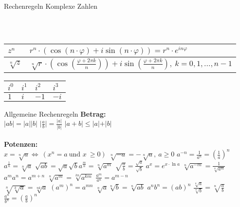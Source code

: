 \begin{Rechenregeln}{Rechenregeln Komplexe Zahlen}{}
\begin{tabular}{|l|l|l|}
        \hline
    \end{tabular}\\
    \begin{tabular}{|l|l|}
        \hline
        \(z^{n}\) & \(r^{n} \cdot (\cos(n\cdot \varphi)+ i \sin(n \cdot \varphi)) = r^{n} \cdot e^{in\varphi}\)\rule{0pt}{2.6ex}\\
        \hline
        \(\sqrt[n]{z}\) & \(\sqrt[n]{r}\cdot(\cos(\frac{\varphi + 2\pi k}{n})) + i\sin(\frac{\varphi + 2 \pi k }{n}), \ k = 0, 1, ..., n-1 \) \rule{0pt}{2.6ex}\\
        \hline
    \end{tabular}
    \begin{tabular}{|l|l|l|l|}
        \hline \(i^{0}\) & \(i^{1}\) & \(i^{2}\) & \(i^{3}\)\\
        \hline \(1\) & \(i\) & \(-1\) & \(-i\)\\
        \hline
    \end{tabular}
\end{Rechenregeln}

\begin{Rechenregeln}{Allgemeine Rechenregeln}{}
    \textbf{Betrag:} \\
    \(\vert ab \vert = \vert a \vert \vert b\vert \) \abstand 
    \(\vert \frac{a}{b} \vert = \frac{\vert a \vert}{ \vert b\vert} \) \abstand
    \(\vert a + b \vert \le \vert a \vert + \vert b \vert\) \\
    \\
    \textbf{Potenzen:} \\
    \(x = \sqrt[n]{a} 	\Leftrightarrow\ (x^{n}  = a \ \text{und } x \ \ge 0)\) \abstand
    \(\sqrt[n]{-a} = - \sqrt[n]{a}, \ a \ge 0\) \abstand
    \(a^{-n} = \frac{1}{a^{n}} = (\frac{1}{a})^{n}\) \abstand \(a^{\frac{1}{n}} = \sqrt[n]{a}\) \abstand \(\sqrt{ab} = \sqrt{a}\sqrt{b}\)\abstand \(a^{\frac{m}{n}} = \sqrt[n]{a^{m}}\) \abstand
    \( \sqrt{\frac{a}{b}} = \frac{\sqrt{a}}{\sqrt{b}} \) \abstand \( a^{x} = e^{x \cdot \ln a}\) \abstand 
    \(\sqrt[n]{a^{-m}} = \frac{1}{\sqrt[n]{a^{m}}}\)
    \(a^{m}a^{n} = a^{m+n} \) \abstand \(\sqrt[n]{a^{m}} = \sqrt[kn]{a^{km}}\) \abstand \(\frac{a^{m}}{a^{n}} = a^{m-n}\)
    \\ \( \sqrt[n]{\sqrt[k]{a}} = \sqrt[nk]{a}\) \abstand  \((a^{m})^{n} = a^{mn}\) \abstand \(\sqrt[n]{a}\sqrt[n]{b} = \sqrt[n]{ab}\) 
    \abstand \(a^{n}b^{n} = (ab)^{n}\) \abstand \(\frac{\sqrt[n]{a}}{\sqrt[n]{b}} = \sqrt[n]{\frac{a}{b}}\) 
    \abstand \(\frac{a^{n}}{b^{n}} = (\frac{a}{b})^{n}\) 
\end{Rechenregeln}

